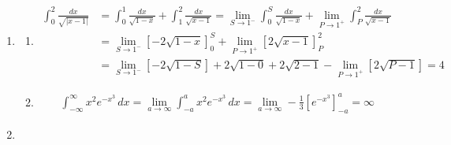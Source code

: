 \documentclass[a4paper, 12pt]{article}
\begin{document}
\begin{enumerate}[leftmargin=*,label=\textbf{\arabic*.}]
\begin{enumerate}[leftmargin=*,label=\textbf{\alph*.}]
\vspace{-2em}
\begin{align*}
\int\sqrt{t-t^2}\,dt=\boxed{\frac14\left[\arcsin\left(\sqrt t\right)-\sqrt{t(1-t)}\cdot(1-2t)\right]+c,\,c\in\mathbb{R}}
\end{align*}

\item Let $u=\sqrt{1+\sqrt x}$.
\[u^2 = 1+\sqrt x\implies u^2-1 = \sqrt x\implies\left(u^2-1\right)^2 = x\implies2\left(u^2-1\right)\cdot 2u\,du = dx\]

\vspace{-2em}
\begin{align*}
\int \sqrt{1+\sqrt{x}}\,dx&=\int u \cdot(2u^2-2)\cdot 2u\,du=\int\left(4u^4-4u^2\right)\,du=\frac{4u^5}5-\frac{4u^3}{3} + c\\[1em]&=\boxed{\frac{4\left(\sqrt{1+\sqrt x}\right)^5}5-\frac{4\left(\sqrt{1+\sqrt x}\right)^3}3+c,\,c\in\mathbb{R}}\end{align*}
\end{enumerate}

\item \begin{enumerate}[leftmargin=*,label=\textbf{\alph*.}]
\item\leavevmode

\vspace{-4em}
\begin{align*}
\int_0^2\frac{dx}{\sqrt{|x-1|}}&=\int_0^1\frac{dx}{\sqrt{1-x}} + \int_1^2\frac{dx}{\sqrt{x-1}}=\lim_{S\to1^-}\int_0^S\frac{dx}{\sqrt{1-x}}+\lim_{P\to1^+}\int_P^2\frac{dx}{\sqrt{x-1}}\\[1em]&=\lim_{S\to1^-}\left[-2\sqrt{1-x}\right]_0^S+\lim_{P\to1^+}\left[2\sqrt{x-1}\right]_P^2\\[1em]&=\lim_{S\to1^-}\left[-2\sqrt{1-S}\right]+2\sqrt{1-0}+2\sqrt{2-1}-\lim_{P\to1^+}\left[2\sqrt{P-1}\right]=\boxed4
\end{align*}

\item\leavevmode

\vspace{-4em}
\begin{align*}\int_{-\infty}^{\infty} x^2 e^{-x^{3}}\,dx=\lim_{a\to\infty}\int_{-a}^{a} x^2 e^{-x^{3}}\,dx=\lim_{a\to\infty}-\frac13\left[ e^{-x^3}\right]_{-a}^a=\boxed\infty\end{align*}
\end{enumerate}

\item\leavevmode


\end{enumerate}
\end{document}
